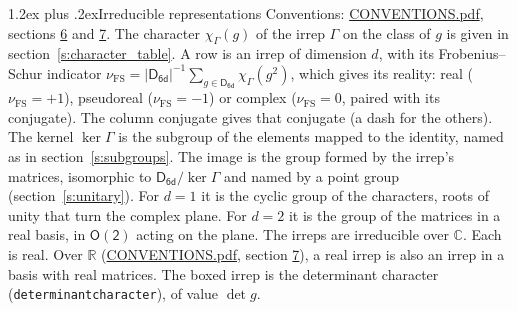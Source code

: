 \documentclass[10pt,a4paper]{article}
\makeatletter
\renewcommand\section{\@startsection{section}{1}{\z@}{-3ex plus -1ex minus -.2ex}%
  {1.2ex plus .2ex}{\normalfont\large\sffamily\bfseries\color{parttitle}}}
\numberwithin{equation}{section}
\newcommand{\grp}[1]{\mathsf{#1}}
\newcommand{\irchar}[1]{\chi_{#1}}
\newcommand{\fsind}{\nu_{\mathrm{FS}}}
\makeatother
\begin{document}
\section{Irreducible representations}\label{s:irreps}
Conventions: \href{../../CONVENTIONS.pdf}{CONVENTIONS.pdf}, sections \href{../../CONVENTIONS.pdf\#conv.6}{6} and \href{../../CONVENTIONS.pdf\#conv.7}{7}.
\leavevmode\label{n:function.character}\label{n:irrep.Gamma}The character $\irchar{\Gamma}(g)$ of the irrep $\Gamma$ on the class of $g$ is given in section~\ref{s:character_table}.
\leavevmode\label{n:index.dimension}\label{n:index.frobenius}\label{n:head.irrep}\label{n:head.reality}A row is an irrep of dimension $d$, with its Frobenius--Schur indicator $\fsind = |\grp{D_{6d}}|^{-1}\allowbreak\sum_{g\in\grp{D_{6d}}}\irchar{\Gamma}(g^2)$, which gives its reality: real ($\fsind = +1$), pseudoreal ($\fsind = -1$) or complex ($\fsind = 0$, paired with its conjugate). \label{n:head.conjugate}The column conjugate gives that conjugate (a dash for the others). \label{n:head.kernel}The kernel $\ker\Gamma$ is the subgroup of the elements mapped to the identity, named as in section~\ref{s:subgroups}. \label{n:head.image}The image is the group formed by the irrep's matrices, isomorphic to $\grp{D_{6d}}/\ker\Gamma$ and named by a point group (section~\ref{s:unitary}). For $d = 1$ it is the cyclic group of the characters, roots of unity that turn the complex plane. For $d = 2$ it is the group of the matrices in a real basis, in $\grp{O(2)}$ acting on the plane. The irreps are irreducible over $\mathbb{C}$. Each is real. Over $\mathbb{R}$ (\href{../../CONVENTIONS.pdf}{CONVENTIONS.pdf}, section \href{../../CONVENTIONS.pdf\#conv.7}{7}), a real irrep is also an irrep in a basis with real matrices. \label{n:mark.determinant}The boxed irrep is the determinant character (\texttt{determinantcharacter}), of value $\det g$.
\setlength{\emergencystretch}{2em}\par\setlength{\emergencystretch}{0pt}
\end{document}
